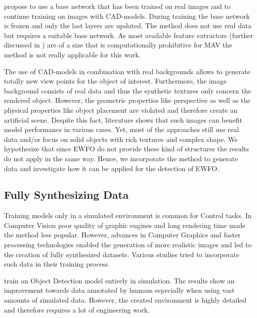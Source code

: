 \citeauthor{Hinterstoisser2017} \cite{Hinterstoisser2017} propose to use a base network that has been trained on real images and to continue training on images with \ac{CAD}-models. During training the base network is frozen and only the last layers are updated. The method does not use real data but requires a suitable base network. As most available feature extractors (further discussed in ) are of a size that is computationally prohibitive for \ac{MAV} the method is not really applicable for this work. 

The use of CAD-models in combination with real backgrounds allows to generate totally new view points for the object of interest. Furthermore, the image background consists of real data and thus the synthetic textures only concern the rendered object. However, the geometric properties like perspective as well as the physical properties like object placement are violated and therefore create an artificial scene. Despite this fact, literature shows that such images can benefit model performance in various cases. Yet, most of the approaches still use real data and/or focus on solid objects with rich textures and complex shape. We hypothesize that since \ac{EWFO} do not provide these kind of structures the results do not apply in the same way. Hence, we incorporate the method to generate data and investigate how it can be applied for the detection of \ac{EWFO}.

\subsection{Fully Synthesizing Data}

Training models only in a simulated environment is common for Control tasks. In Computer Vision poor quality of graphic engines and long rendering time made the method less popular. However, advances in Computer Graphics and faster processing technologies enabled the generation of more realistic images and led to the creation of fully synthesized datasets\cite{Ros2016, Gaidon2016}. Various studies tried to incorporate such data in their training process.

\citeauthor{Johnson-Roberson2016} \cite{Johnson-Roberson2016} train an Object Detection model entirely in simulation. The results show an improvement towards data annotated by humans especially when using vast amounts of simulated data. However, the created environment is highly detailed and therefore requires a lot of engineering work. 

